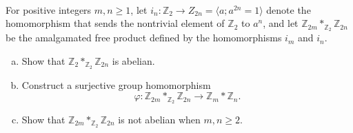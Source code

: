 \documentclass{article}
\newenvironment{problem}[2][Problem]{\begin{trivlist}
\item[\hskip \labelsep {\bfseries #1}\hskip \labelsep {\bfseries #2.}]}{\end{trivlist}}
\begin{document}
\pagebreak
\begin{problem}{3} \text{} \\
  For positive integers $m, n \geq 1$, let
  $i_n\colon\mathbb Z_2 \rightarrow Z_{2n} = \langle a; a^{2n} = 1 \rangle$
  denote the homomorphism that sends the nontrivial element of
  $\mathbb Z_2$ to $a^n$, and let
  $\mathbb Z_{2m} *_{\mathbb Z_2} \mathbb Z_{2n}$ be the amalgamated free
  product defined by the homomorphisms $i_m$ and $i_n$.
  \begin{enumerate}[a.]
    \item Show that $\mathbb Z_2 *_{\mathbb Z_2} \mathbb Z_{2n}$ is abelian.
    \item Construct a surjective group homomorphism \[
      \varphi\colon\mathbb Z_{2m} *_{\mathbb Z_2} \mathbb Z_{2n}
      \rightarrow \mathbb Z_m * \mathbb Z_n.
    \]
    \item Show that $\mathbb Z_{2m} *_{\mathbb Z_2} \mathbb Z_{2n}$ is not
    abelian when $m, n \geq 2$.
  \end{enumerate}
\end{problem}
\end{document}
